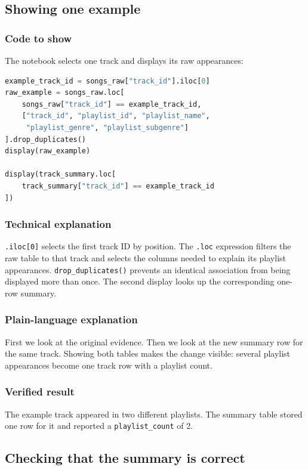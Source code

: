 \documentclass[11pt,a4paper]{article}
\begin{document}
\subsection{Showing one example}

\subsubsection*{Code to show}
The notebook selects one track and displays its raw appearances:

\begin{lstlisting}[language=Python]
example_track_id = songs_raw["track_id"].iloc[0]
raw_example = songs_raw.loc[
    songs_raw["track_id"] == example_track_id,
    ["track_id", "playlist_id", "playlist_name",
     "playlist_genre", "playlist_subgenre"]
].drop_duplicates()
display(raw_example)

display(track_summary.loc[
    track_summary["track_id"] == example_track_id
])
\end{lstlisting}

\subsubsection*{Technical explanation}
\texttt{.iloc[0]} selects the first track ID by position. The \texttt{.loc} expression filters the raw table to that track and selects the columns needed to explain its playlist appearances. \texttt{drop\_duplicates()} prevents an identical association from being displayed more than once. The second display looks up the corresponding one-row summary.

\subsubsection*{Plain-language explanation}
First we look at the original evidence. Then we look at the new summary row for the same track. Showing both tables makes the change visible: several playlist appearances become one track row with a playlist count.

\subsubsection*{Verified result}
The example track appeared in two different playlists. The summary table stored one row for it and reported a \texttt{playlist\_count} of 2.

\subsection{Checking that the summary is correct}
\end{document}
